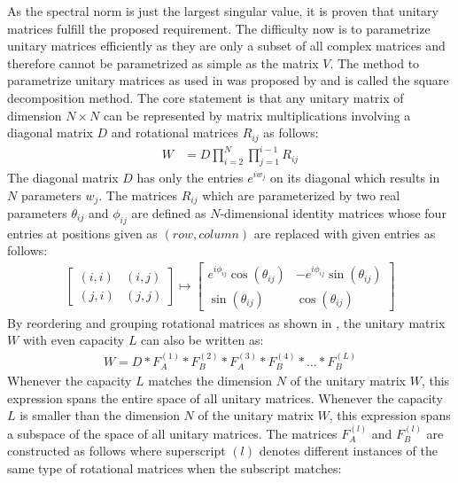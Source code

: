 \documentclass[draft,final]{vutinfth} %
\begin{document}
    As the spectral norm is just the largest singular value, it is proven that unitary matrices fulfill the proposed requirement.
    The difficulty now is to parametrize unitary matrices efficiently as they are only a subset of all complex matrices and therefore cannot be parametrized as simple as the matrix $V$.
    The method to parametrize unitary matrices as used in \cite[p. 3]{EfficientUnitaryRNNs} was proposed by \cite{UnitaryMatrixParametrization} and is called the square decomposition method.
    The core statement is that any unitary matrix of dimension $N \times N$ can be represented by matrix multiplications involving a diagonal matrix $D$ and rotational matrices $R_{ij}$ as follows:
    \begin{align}
        W &= D \prod_{i=2}^N \prod_{j=1}^{i-1} R_{ij}
    \end{align}
    The diagonal matrix $D$ has only the entries $e^{iw_j}$ on its diagonal which results in $N$ parameters $w_j$.
    The matrices $R_{ij}$ which are parameterized by two real parameters $\theta_{ij}$ and $\phi_{ij}$ are defined as $N$-dimensional identity matrices whose four entries at positions given as $(row,column)$ are replaced with given entries as follows:
    \begin{align}
        \begin{bmatrix}
        (i,i)
            & (i,j) \\
            (j,i) & (j,j)
        \end{bmatrix} \mapsto
        \begin{bmatrix}
            e^{i\phi_{ij}}\cos (\theta_{ij})  & -e^{i\phi_{ij}}\sin (\theta_{ij}) \\
            \sin (\theta_{ij}) & \cos (\theta_{ij})
        \end{bmatrix}
    \end{align}
    By reordering and grouping rotational matrices as shown in \cite[p. 4]{EfficientUnitaryRNNs}, the unitary matrix $W$ with even capacity $L$ can also be written as:
    \begin{align}
        W = D * F_A^{(1)} * F_B^{(2)} * F_A^{(3)} * F_B^{(4)} * \ldots * F_B^{(L)}
    \end{align}
    Whenever the capacity $L$ matches the dimension $N$ of the unitary matrix $W$, this expression spans the entire space of all unitary matrices.
    Whenever the capacity $L$ is smaller than the dimension $N$ of the unitary matrix $W$, this expression spans a subspace of the space of all unitary matrices.
    The matrices $F_A^{(l)}$ and $F_B^{(l)}$ are constructed as follows where superscript $(l)$ denotes different instances of the same type of rotational matrices when the subscript matches:
\end{document}
